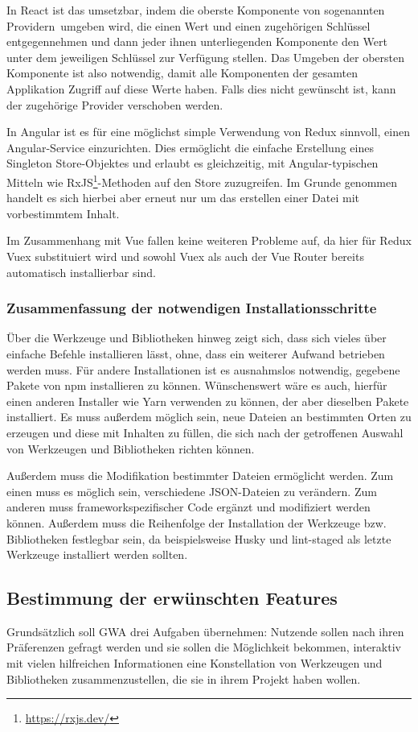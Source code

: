 In React ist das umsetzbar, indem die oberste Komponente von sogenannten \glqq Providern\grqq\ umgeben wird, die einen Wert und einen zugehörigen Schlüssel entgegennehmen und dann jeder ihnen unterliegenden Komponente den Wert unter dem jeweiligen Schlüssel zur Verfügung stellen. Das Umgeben der obersten Komponente ist also notwendig, damit alle Komponenten der gesamten Applikation Zugriff auf diese Werte haben. Falls dies nicht gewünscht ist, kann der zugehörige Provider verschoben werden.

In Angular ist es für eine möglichst simple Verwendung von Redux sinnvoll, einen Angular-Service einzurichten. Dies ermöglicht die einfache Erstellung eines Singleton Store-Objektes und erlaubt es gleichzeitig, mit Angular-typischen Mitteln wie RxJS\footnote{\url{https://rxjs.dev/}}-Methoden auf den Store zuzugreifen. Im Grunde genommen handelt es sich hierbei aber erneut nur um das erstellen einer Datei mit vorbestimmtem Inhalt.

Im Zusammenhang mit Vue fallen keine weiteren Probleme auf, da hier für Redux Vuex substituiert wird und sowohl Vuex als auch der Vue Router bereits automatisch installierbar sind.

\subsubsection{Zusammenfassung der notwendigen Installationsschritte}
Über die Werkzeuge und Bibliotheken hinweg zeigt sich, dass sich vieles über einfache Befehle installieren lässt, ohne, dass ein weiterer Aufwand betrieben werden muss. Für andere Installationen ist es ausnahmslos notwendig, gegebene Pakete von \gls{npm} installieren zu können. Wünschenswert wäre es auch, hierfür einen anderen Installer wie Yarn verwenden zu können, der aber dieselben Pakete installiert. Es muss außerdem möglich sein, neue Dateien an bestimmten Orten zu erzeugen und diese mit Inhalten zu füllen, die sich nach der getroffenen Auswahl von Werkzeugen und Bibliotheken richten können.

Außerdem muss die Modifikation bestimmter Dateien ermöglicht werden. Zum einen muss es möglich sein, verschiedene \gls{JSON}-Dateien zu verändern. Zum anderen muss frameworkspezifischer Code ergänzt und modifiziert werden können. Außerdem muss die Reihenfolge der Installation der Werkzeuge bzw. Bibliotheken festlegbar sein, da beispielsweise Husky und lint-staged als letzte Werkzeuge installiert werden sollten.

\subsection{Bestimmung der erwünschten Features}
\label{konz:all_features}
Grundsätzlich soll \gls{GWA} drei Aufgaben übernehmen: Nutzende sollen nach ihren Präferenzen gefragt werden und sie sollen die Möglichkeit bekommen, interaktiv mit vielen hilfreichen Informationen eine Konstellation von Werkzeugen und Bibliotheken zusammenzustellen, die sie in ihrem Projekt haben wollen.

